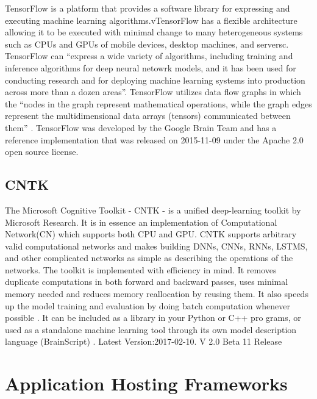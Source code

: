     TensorFlow is a platform that provides a software library for
    expressing and executing machine learning
    algorithms.vTensorFlow has a
    flexible architecture allowing it to be executed with minimal
    change to many heterogeneous systems such as CPUs and GPUs of mobile
    devices, desktop machines, and serversc\cite{tensorflow-paper-2016}.
    TensorFlow can ``express a
    wide variety of algorithms, including training and inference
    algorithms for deep neural netowrk models, and it has been used
    for conducting research and for deploying machine learning systems
    into production across more than a dozen
    areas''. TensorFlow utilizes data flow graphs in which
    the ``nodes in the graph represent mathematical operations, while
    the graph edges represent the multidimensional data arrays (tensors)
    communicated between them'' \cite{www-tensorflow}.
    TensorFlow was developed by the Google Brain Team and has a
    reference implementation that was released on 2015-11-09 under the
    Apache 2.0 open source license.

    \pv
    
\subsection{CNTK}

    The Microsoft Cognitive Toolkit - CNTK - is a unified
    deep-learning toolkit by Microsoft Research. It is in essence an
    implementation of Computational Network(CN) which supports both
    CPU and GPU. CNTK supports arbitrary valid computational networks
    and makes building DNNs, CNNs, RNNs, LSTMS, and other complicated
    networks as simple as describing the operations of the networks.
    The toolkit is implemented with efficiency in mind. It removes
    duplicate computations in both forward and backward passes, uses
    minimal memory needed and reduces memory reallocation by reusing
    them. It also speeds up the model training and evaluation by doing
    batch computation whenever possible \cite{book-cntk}. It can be
    included as a library in your Python or C++ pro grams, or used as
    a standalone machine learning tool through its own model
    description language (BrainScript) \cite{www-cntk}. Latest
    Version:2017-02-10. V 2.0 Beta 11 Release


\section{Application Hosting Frameworks}

